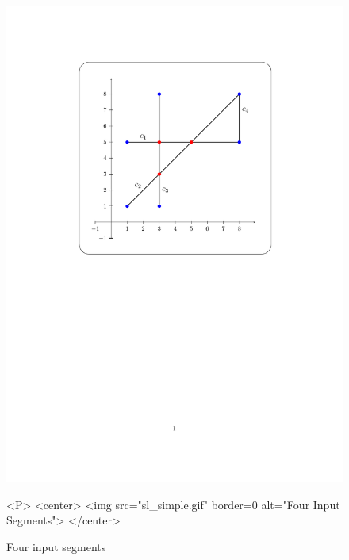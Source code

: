 \begin{figure}[hbp]
\begin{ccTexOnly}
\centerline{\includegraphics{Sweep_line_2/sl_simple}}
\end{ccTexOnly}

\caption{Four input segments
\label{SL_sec:simple}}

\begin{ccHtmlOnly}
<P>
<center>
  <img src="sl_simple.gif" border=0 alt="Four Input Segments">
</center>
\end{ccHtmlOnly}
\end{figure}

